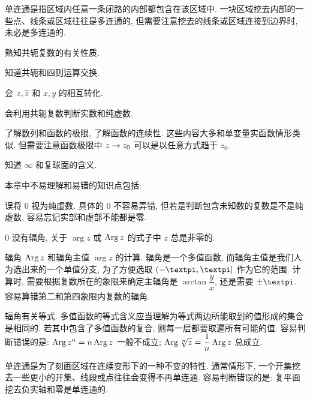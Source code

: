 \begin{conclusion}
\begin{conclusion}
    \item 单连通是指区域内任意一条闭路的内部都包含在该区域中.
    一块区域挖去内部的一些点、线条或区域往往是多连通的,  但需要注意挖去的线条或区域连接到边界时, 未必是多连通的.
  \end{conclusion}
  \item 熟知共轭复数的有关性质.
  \begin{conclusion}
    \item 知道共轭和四则运算交换.
    \item 会 $z,\overline z$ 和 $x,y$ 的相互转化.
    \item 会利用共轭复数判断实数和纯虚数.
  \end{conclusion}
  \item 了解数列和函数的极限, 了解函数的连续性. 这些内容大多和单变量实函数情形类似, 但需要注意函数极限中 $z\rightarrow z_0$ 可以是以任意方式趋于 $z_0$.
  \item 知道 $\infty$ 和复球面的含义.
\end{conclusion}

本章中不易理解和易错的知识点包括:
\begin{enuma}
  \item 误将 $0$ 视为纯虚数. 具体的 $0$ 不容易弄错, 但若是判断包含未知数的复数是不是纯虚数, 容易忘记实部和虚部不能都是零.
  \item $0$ 没有辐角, 关于 $\arg z$ 或 $\operatorname{Arg} z$ 的式子中 $z$ 总是非零的.
  \item 辐角 $\operatorname{Arg} z$ 和辐角主值 $\arg z$ 的计算. 辐角是一个多值函数, 而辐角主值是我们人为选出来的一个单值分支, 为了方便选取 $(-\cpi,\cpi]$ 作为它的范围. 计算时, 需要根据复数所在的象限来确定主辐角是 $\arctan\dfrac yx$, 还是需要 $\pm\cpi$. 
  容易算错第二和第四象限内复数的辐角.
  \item 辐角有关等式. 多值函数的等式含义应当理解为等式两边所能取到的值形成的集合是相同的. 若其中包含了多值函数的复合, 则每一层都要取遍所有可能的值.
  容易判断错误的是: $\operatorname{Arg} z^n=n\operatorname{Arg} z$ 一般不成立; $\operatorname{Arg} \sqrt[n]z=\dfrac1n\operatorname{Arg} z$ 总成立.
  \item 单连通是为了刻画区域在连续变形下的一种不变的特性. 通常情形下, 一个开集挖去一些更小的开集、线段或点往往会变得不再单连通.
  容易判断错误的是: 复平面挖去负实轴和零是单连通的.
\end{enuma}



